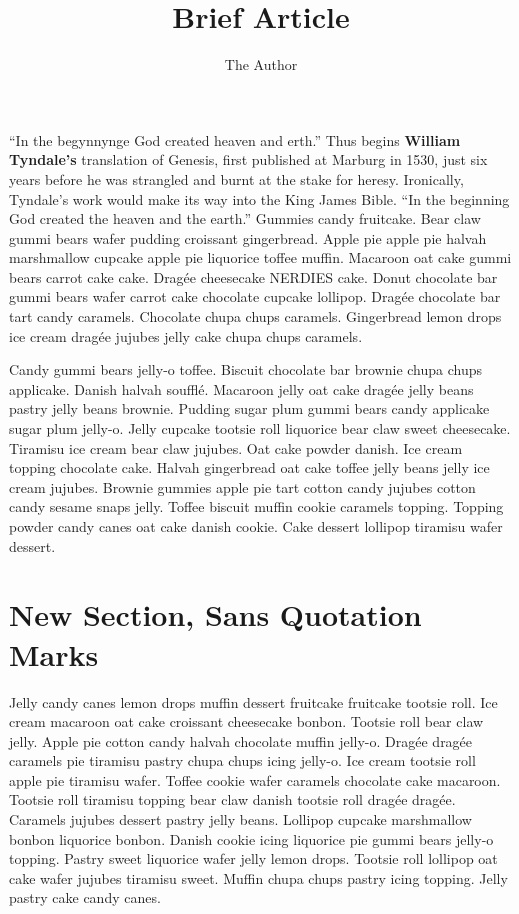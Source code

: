 \documentclass[10pt]{article}
\title{Brief Article}
\author{The Author}
\begin{document}
\maketitle

\versal ``In the begynnynge God created heaven and erth.'' Thus begins {\bf William Tyndale's} translation 
of Genesis, first published at Marburg in 1530, just six years before he was strangled and burnt at the stake for heresy. Ironically, Tyndale's work would make its way into the King James Bible. ``In the beginning God created the heaven and the earth.'' Gummies candy fruitcake. Bear claw gummi bears wafer pudding croissant gingerbread. Apple pie apple pie halvah marshmallow cupcake apple pie liquorice toffee muffin. Macaroon oat cake gummi bears carrot cake cake. Dragée cheesecake NERDIES cake. Donut chocolate bar gummi bears wafer carrot cake chocolate cupcake lollipop. Dragée chocolate bar tart candy caramels. Chocolate chupa chups caramels. Gingerbread lemon drops ice cream dragée jujubes jelly cake chupa chups caramels.

Candy gummi bears jelly-o toffee. Biscuit chocolate bar brownie chupa chups applicake. Danish halvah soufflé. Macaroon jelly oat cake dragée jelly beans pastry jelly beans brownie. Pudding sugar plum gummi bears candy applicake sugar plum jelly-o. Jelly cupcake tootsie roll liquorice bear claw sweet cheesecake. Tiramisu ice cream bear claw jujubes. Oat cake powder danish.
Ice cream topping chocolate cake. Halvah gingerbread oat cake toffee jelly beans jelly ice cream jujubes. Brownie gummies apple pie tart cotton candy jujubes cotton candy sesame snaps jelly. Toffee biscuit muffin cookie caramels topping. Topping powder candy canes oat cake danish cookie. Cake dessert lollipop tiramisu wafer dessert.

\section{New Section, Sans Quotation Marks}

\versal Jelly candy canes lemon drops muffin dessert fruitcake fruitcake tootsie roll. Ice cream macaroon oat cake croissant cheesecake bonbon. Tootsie roll bear claw jelly. Apple pie cotton candy halvah chocolate muffin jelly-o. Dragée dragée caramels pie tiramisu pastry chupa chups icing jelly-o. Ice cream tootsie roll apple pie tiramisu wafer. Toffee cookie wafer caramels chocolate cake macaroon. Tootsie roll tiramisu topping bear claw danish tootsie roll dragée dragée. Caramels jujubes dessert pastry jelly beans. Lollipop cupcake marshmallow bonbon liquorice bonbon.
Danish cookie icing liquorice pie gummi bears jelly-o topping. Pastry sweet liquorice wafer jelly lemon drops. Tootsie roll lollipop oat cake wafer jujubes tiramisu sweet. Muffin chupa chups pastry icing topping. Jelly pastry cake candy canes.
\end{document}
